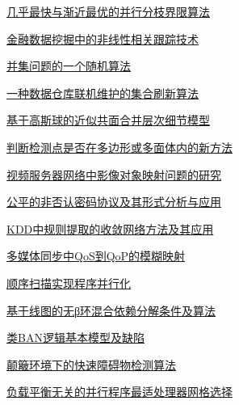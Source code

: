\documentclass[a4paper]{article}
\begin{document}
\href{http://www.jos.org.cn/ch/reader/download_pdf.aspx?file_no=20001202&year_id=2000&quarter_id=12&falg=1}{几乎最快与渐近最优的并行分枝界限算法}

\href{http://www.jos.org.cn/ch/reader/download_pdf.aspx?file_no=20001203&year_id=2000&quarter_id=12&falg=1}{金融数据挖掘中的非线性相关跟踪技术}

\href{http://www.jos.org.cn/ch/reader/download_pdf.aspx?file_no=20001204&year_id=2000&quarter_id=12&falg=1}{并集问题的一个随机算法}

\href{http://www.jos.org.cn/ch/reader/download_pdf.aspx?file_no=20001205&year_id=2000&quarter_id=12&falg=1}{一种数据仓库联机维护的集合刷新算法}

\href{http://www.jos.org.cn/ch/reader/download_pdf.aspx?file_no=20001207&year_id=2000&quarter_id=12&falg=1}{基于高斯球的近似共面合并层次细节模型}

\href{http://www.jos.org.cn/ch/reader/download_pdf.aspx?file_no=20001208&year_id=2000&quarter_id=12&falg=1}{判断检测点是否在多边形或多面体内的新方法}

\href{http://www.jos.org.cn/ch/reader/download_pdf.aspx?file_no=20001209&year_id=2000&quarter_id=12&falg=1}{视频服务器网络中影像对象映射问题的研究}

\href{http://www.jos.org.cn/ch/reader/download_pdf.aspx?file_no=20001210&year_id=2000&quarter_id=12&falg=1}{公平的非否认密码协议及其形式分析与应用}

\href{http://www.jos.org.cn/ch/reader/download_pdf.aspx?file_no=20001211&year_id=2000&quarter_id=12&falg=1}{KDD中规则提取的收敛网络方法及其应用}

\href{http://www.jos.org.cn/ch/reader/download_pdf.aspx?file_no=20001212&year_id=2000&quarter_id=12&falg=1}{多媒体同步中QoS到QoP的模糊映射}

\href{http://www.jos.org.cn/ch/reader/download_pdf.aspx?file_no=20001213&year_id=2000&quarter_id=12&falg=1}{顺序扫描实现程序并行化}

\href{http://www.jos.org.cn/ch/reader/download_pdf.aspx?file_no=20001214&year_id=2000&quarter_id=12&falg=1}{基于线图的无β环混合依赖分解条件及算法}

\href{http://www.jos.org.cn/ch/reader/download_pdf.aspx?file_no=20001215&year_id=2000&quarter_id=12&falg=1}{类BAN逻辑基本模型及缺陷}

\href{http://www.jos.org.cn/ch/reader/download_pdf.aspx?file_no=20001216&year_id=2000&quarter_id=12&falg=1}{颠簸环境下的快速障碍物检测算法}

\href{http://www.jos.org.cn/ch/reader/download_pdf.aspx?file_no=20001217&year_id=2000&quarter_id=12&falg=1}{负载平衡无关的并行程序最适处理器网格选择}
\end{document}

